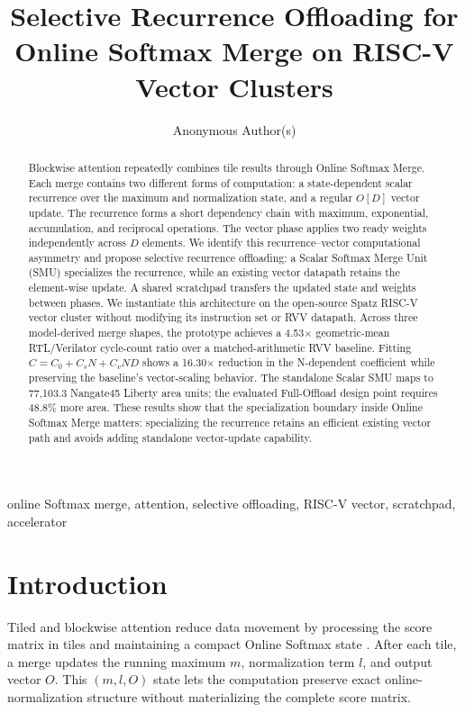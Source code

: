 \documentclass[journal]{IEEEtran}
\title{Selective Recurrence Offloading for Online Softmax Merge on RISC-V Vector Clusters}
\author{Anonymous Author(s)}
\begin{document}
\maketitle

\begin{abstract}
Blockwise attention repeatedly combines tile results through Online Softmax
Merge. Each merge contains two different forms of computation: a
state-dependent scalar recurrence over the maximum and normalization state,
and a regular $O[D]$ vector update. The recurrence forms a short dependency
chain with maximum, exponential, accumulation, and reciprocal operations. The
vector phase applies two ready weights independently across $D$ elements. We
identify this recurrence--vector computational asymmetry and propose selective
recurrence offloading: a Scalar Softmax Merge Unit (SMU) specializes the
recurrence, while an existing vector datapath retains the element-wise update.
A shared scratchpad transfers the updated state and weights between phases. We
instantiate this architecture on the open-source Spatz RISC-V vector cluster
without modifying its instruction set or RVV datapath. Across three
model-derived merge shapes, the prototype achieves a 4.53$\times$
geometric-mean RTL/Verilator cycle-count ratio over a matched-arithmetic RVV
baseline. Fitting $C=C_0+C_sN+C_vND$ shows a 16.30$\times$ reduction in the
N-dependent coefficient while preserving the baseline's vector-scaling
behavior. The standalone Scalar SMU maps to 77,103.3 Nangate45 Liberty area
units; the evaluated Full-Offload design point requires 48.8\% more area.
These results show that the specialization boundary inside Online Softmax
Merge matters: specializing the recurrence retains an efficient existing
vector path and avoids adding standalone vector-update capability.
\end{abstract}

\begin{IEEEkeywords}
online Softmax merge, attention, selective offloading, RISC-V vector,
scratchpad, accelerator
\end{IEEEkeywords}

\section{Introduction}

Tiled and blockwise attention reduce data movement by processing the score
matrix in tiles and maintaining a compact Online Softmax state
\cite{milakov2018online,dao2022flashattention}. After each tile, a merge updates
the running maximum $m$, normalization term $l$, and output vector $O$. This
$(m,l,O)$ state lets the computation preserve exact online-normalization
structure without materializing the complete score matrix.
\end{document}
